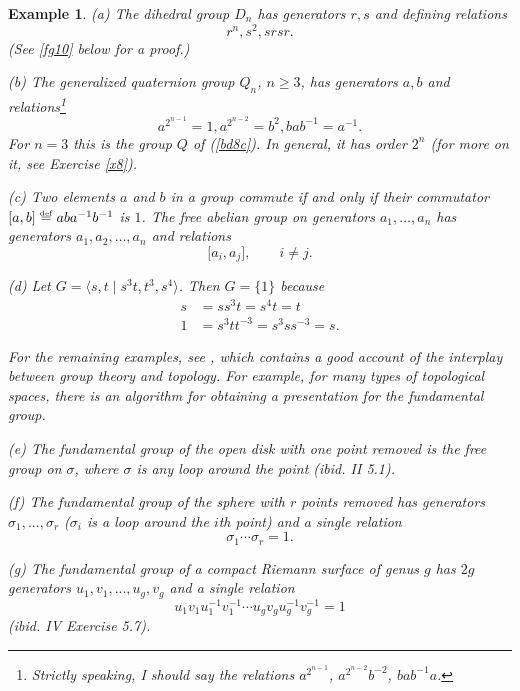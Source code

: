 \documentclass[a4paper,11pt,final]{memoir}%
\newtheorem{example}[X]{Example}
\theoremstyle{nonumberplain}
\begin{document}
\begin{example}
\label{fg08} (a) The dihedral group $D_{n}$ has generators $r,s$ and defining
relations
\[
r^{n},s^{2},srsr.
\]
(See \ref{fg10} below for a proof.)

(b) The \emph{generalized quaternion group}%
$Q_{n}$, $n\geq3$, has generators $a,b$ and relations\footnote{Strictly
speaking, I should say the relations $a^{2^{n-1}}$, $a^{2^{n-2}}b^{-2}$,
$bab^{-1}a$.}
\[
a^{2^{n-1}}=1,a^{2^{n-2}}=b^{2},bab^{-1}=a^{-1}.
\]
For $n=3$ this is the group $Q$ of (\ref{bd8c}). In general, it has order
$2^{n}$ (for more on it, see Exercise \ref{x8}).

(c) Two elements $a$ and $b$ in a group commute if and only if their
\emph{commutator}%
$[a,b]\overset{\df}{=}aba^{-1}b^{-1}$ is $1$. The \emph{free
abelian\/ group}%
on generators $a_{1},\ldots,a_{n}$ has generators $a_{1},a_{2},\ldots,a_{n}$
and relations
\[
\lbrack a_{i},a_{j}],\qquad i\neq j.
\]


(d) Let $G=\langle s,t\mid s^{3}t,t^{3},s^{4}\rangle$. Then $G=\{1\}$ because%
\begin{align*}
s  &  =ss^{3}t=s^{4}t=t\\
1  &  =s^{3}tt^{-3}=s^{3}ss^{-3}=s.
\end{align*}


For the remaining examples, see \cite{massey1967}, which contains a good
account of the interplay between group theory and topology. For example, for
many types of topological spaces, there is an algorithm for obtaining a
presentation for the fundamental group.

(e) The fundamental group of the open disk with one point removed is the free
group on $\sigma$, where $\sigma$ is any loop around the point (ibid. II 5.1).

(f) The fundamental group of the sphere with $r$ points removed has generators
$\sigma_{1},...,\sigma_{r}$ ($\sigma_{i}$ is a loop around the $i$th point)
and a single relation
\[
\sigma_{1}\cdots\sigma_{r}=1.
\]


(g) The fundamental group of a compact Riemann surface of genus $g$ has $2g$
generators $u_{1},v_{1},...,u_{g},v_{g}$ and a single relation
\[
u_{1}v_{1}u_{1}^{-1}v_{1}^{-1}\cdots u_{g}v_{g}u_{g}^{-1}v_{g}^{-1}=1
\]
(ibid. IV Exercise 5.7).
\end{example}
\end{document}
